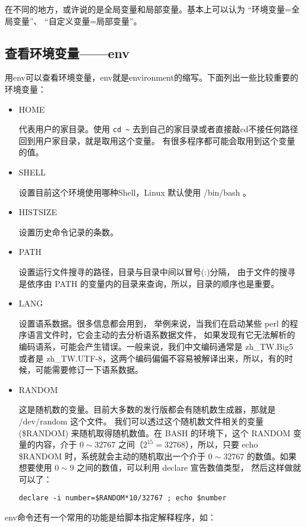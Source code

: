 {在不同的地方，或许说的是全局变量和局部变量。基本上可以认为 “环境变量=全局变量”、 “自定义变量=局部变量”。





\subsection{查看环境变量——env}
用env可以查看环境变量，env就是environment的缩写。下面列出一些比较重要的环境变量：
\begin{itemize}
\item HOME

代表用户的家目录。使用 \verb|cd ~| 去到自己的家目录或者直接敲cd不接任何路径回到用户家目录，就是取用这个变量。 有很多程序都可能会取用到这个变量的值。

\item SHELL

设置目前这个环境使用哪种Shell，Linux 默认使用 /bin/bash 。

\item HISTSIZE

设置历史命令记录的条数。

\item PATH

设置运行文件搜寻的路径，目录与目录中间以冒号(:)分隔， 由于文件的搜寻是依序由 PATH 的变量内的目录来查询，所以，目录的顺序也是重要。

\item LANG

设置语系数据。很多信息都会用到， 举例来说，当我们在启动某些 perl 的程序语言文件时，它会主动的去分析语系数据文件， 如果发现有它无法解析的编码语系，可能会产生错误。一般来说，我们中文编码通常是 zh\_TW.Big5 或者是 zh\_TW.UTF-8，这两个编码偏偏不容易被解译出来，所以，有的时候，可能需要修订一下语系数据。 

\item RANDOM

这是随机数的变量。目前大多数的发行版都会有随机数生成器，那就是 /dev/random 这个文件。 我们可以透过这个随机数文件相关的变量 (\$RANDOM) 来随机取得随机数值。在 BASH 的环境下，这个 RANDOM 变量的内容，介于 $0\sim32767$ 之间（$2^{15}=32768$），所以，只要 echo \$RANDOM 时，系统就会主动的随机取出一个介于 $0\sim32767$ 的数值。如果想要使用 $0\sim9$ 之间的数值，可以利用 declare 宣告数值类型， 然后这样做就可以了：

\verb|declare -i number=$RANDOM*10/32767 ; echo $number|
\end{itemize}

env命令还有一个常用的功能是给脚本指定解释程序，如：

}

